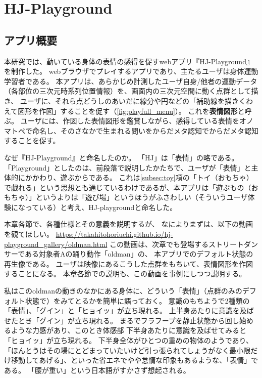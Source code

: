 \chapter{HJ-Playground}
\label{chapter:hj-playground}

\section{アプリ概要}
本研究では、動いている身体の表情の感得を促すwebアプリ『HJ-Playground』を制作した。
webブラウザでプレイするアプリであり、主たるユーザは身体運動学習者である。
本アプリは、あらかじめ計測したユーザ自身/他者の運動データ（各部位の三次元時系列位置情報）を、画面内の三次元空間に動く点群として描き、
ユーザに、それら点どうしのあいだに線分や円などの「補助線を描きくわえて図形を作図」することを促す（\autoref{fig:playfull_menu}）。
これを\textbf{表情図形}と呼ぶ。
ユーザには、作図した表情図形を鑑賞しながら、感得している表情をオノマトペで命名し、そのさなかで生まれる問いをからだメタ認知でからだメタ認知することを促す。


なぜ『HJ-Playground』と命名したのか。
「HJ」は「表情」の略である。
「Playground」としたのは、前段落で説明したかたちで、ユーザが「表情」と主体的にかかわり、遊ぶからである。
これは\ref{subsec:toy}項の「トイ（おもちゃ）で戯れる」という思想とも通じているわけであるが、本アプリは「遊ぶもの（おもちゃ）」というよりは「遊び場」というほうがふさわしい（そういうユーザ体験になっている）と考え、HJ-playgroundと命名した。



本章各節で、各種仕様とその意義を説明するが、
なによりまずは、以下の動画を観てほしい。
\href{https://takahitohoriuchi.github.io/hj-playground_gallery/oldman.html}{https://takahitohoriuchi.github.io/hj-playground_gallery/oldman.html}
この動画は、次章でも登場するストリートダンサーである対象者Aの踊り動作「oldman」の、
本アプリでのデフォルト状態の再生像である。
ユーザは映像にあるこうした点群をもちいて、表情図形を作図することになる。
本章各節での説明も、この動画を事例にしつつ説明する。


私はこのoldmanの動きのなかにある身体に、どういう「表情」（点群のみのデフォルト状態で）をみてとるかを簡単に語っておく。
意識のもちようで2種類の「表情」、「グイン」と「ヒョイッ」が立ち現れる。
上半身あたりに意識を及ばせたとき「グイン」が立ち現れる。
まるでフラフープを静止状態から回し始めるような力感があり、このとき体感部
下半身あたりに意識を及ばせてみると「ヒョイッ」が立ち現れる。
下半身全体がひとつの重めの物体のようであり、「ほんとうはその場にとどまっていたいけど引っ張られてしょうがなく最小限だけ移動してあげる」、といった省エネでやや怠惰な印象もあるような、「表情」である。
「腰が重い」という日本語がすかさず想起される。


